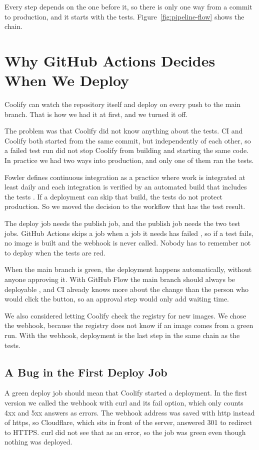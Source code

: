 \documentclass[a4paper,11pt]{article}
\begin{document}

Every step depends on the one before it, so there is only one way from a commit to production, and it starts with the tests. Figure~\ref{fig:pipeline-flow} shows the chain.

\section{Why GitHub Actions Decides When We Deploy}
Coolify can watch the repository itself and deploy on every push to the main branch. That is how we had it at first, and we turned it off.

The problem was that Coolify did not know anything about the tests. CI and Coolify both started from the same commit, but independently of each other, so a failed test run did not stop Coolify from building and starting the same code. In practice we had two ways into production, and only one of them ran the tests.

Fowler defines continuous integration as a practice where work is integrated at least daily and each integration is verified by an automated build that includes the tests \cite{fowler-continuous-integration}. If a deployment can skip that build, the tests do not protect production. So we moved the decision to the workflow that has the test result.

The deploy job needs the publish job, and the publish job needs the two test jobs. GitHub Actions skips a job when a job it needs has failed \cite{github-workflow-syntax}, so if a test fails, no image is built and the webhook is never called. Nobody has to remember not to deploy when the tests are red.

When the main branch is green, the deployment happens automatically, without anyone approving it. With GitHub Flow the main branch should always be deployable \cite{chacon-github-flow-2011}, and CI already knows more about the change than the person who would click the button, so an approval step would only add waiting time.

We also considered letting Coolify check the registry for new images. We chose the webhook, because the registry does not know if an image comes from a green run. With the webhook, deployment is the last step in the same chain as the tests.

\subsection*{A Bug in the First Deploy Job}
A green deploy job should mean that Coolify started a deployment. In the first version we called the webhook with curl and its fail option, which only counts 4xx and 5xx answers as errors. The webhook address was saved with http instead of https, so Cloudflare, which sits in front of the server, answered 301 to redirect to HTTPS. curl did not see that as an error, so the job was green even though nothing was deployed.
\end{document}
